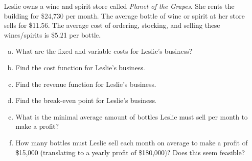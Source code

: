 \documentclass[11pt,letterpaper]{article}
\begin{document}
\newpage



 Leslie owns a wine and spirit store called \textit{Planet of the Grapes}. She rents the building for \$24,730 per month. The average bottle of wine or spirit at her store sells for \$11.56. The average cost of ordering, stocking, and selling these wines/spirits is \$5.21 per bottle. 
	\begin{enumerate}[(a)]
	\item What are the fixed and variable costs for Leslie's business?
	\item Find the cost function for Leslie's business.
	\item Find the revenue function for Leslie's business.
	\item Find the break-even point for Leslie's business. 
	\item What is the minimal average amount of bottles Leslie must sell per month to make a profit?
	\item How many bottles must Leslie sell each month on average to make a profit of \$15,000 (translating to a yearly profit of \$180,000)? Does this seem feasible?	
	\end{enumerate} \pspace
\end{document}
